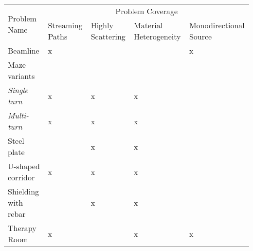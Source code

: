\begin{tabular}{l|m{2cm}m{2cm}m{2.5cm}m{2.5cm}}
\toprule
\multirow{2}{*}{Problem Name} &  \multicolumn{4}{c}{Problem Coverage} \\
{} &  Streaming Paths & Highly Scattering & Material Heterogeneity &
Monodirectional Source \\
\midrule
Beamline              & x &   &   & x \\
Maze variants         &   &   &   &   \\
\textit{Single turn}  & x & x & x &   \\
\textit{Multi-turn}   & x & x & x &   \\
Steel plate           &   & x & x &   \\
U-shaped corridor     & x & x & x &   \\
Shielding with rebar  &   & x & x &   \\
Therapy Room          & x &   & x & x \\
\bottomrule
\end{tabular}

